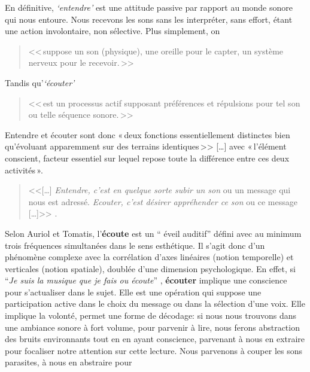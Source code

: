 En définitive, \emph{`entendre'} est une attitude passive par rapport au monde sonore
qui nous entoure. Nous recevons les sons sans les interpréter, sans
effort, étant une action involontaire, non
sélective. Plus simplement, on
\begin{quote}
	<<\,suppose un son (physique), une oreille
	pour le capter, un système nerveux pour le recevoir.\,>>\autocite[2]{auriol:cle}
 \end{quote}
 Tandis qu'\textit{`écouter'}
\begin{quote}
	<<\,est un
	processus actif supposant préférences et répulsions pour tel son ou
	telle séquence sonore.\,>>\autocite[2]{auriol:cle}

\end{quote}
Entendre et écouter sont donc  «\,deux
fonctions essentiellement distinctes bien qu'évoluant apparemment sur
des terrains iden\-ti\-ques\,>>
[\dots] avec «\,l'é\-lé\-ment cons\-cient, facteur essentiel sur lequel repose toute la
différence entre ces deux activités\,». \autocite[122]{tomatis_oreille_1987}
\begin{quote}

	<<[\ldots] \emph{Entendre, c'est en quelque sorte subir
		un son} ou un message qui nous est adressé. \emph{Ecouter, c'est désirer appréhender ce son} ou ce message [\ldots]>>
	\autocite [p. 111]{tomatis:education}.
\end{quote}
Selon Auriol %
 et Tomatis, l'\textbf{écoute} est un `` éveil auditif''  défini avec au
minimum trois
fréquences simultanées dans le sens esthétique. %
Il s'agit donc d'un phénomène
complexe avec la corrélation d'axes
linéaires (notion temporelle) et verticales (notion spatiale), doublée d'une
dimension psychologique.
En effet, si \enquote{\emph{Je suis la musique que je fais ou écoute}}
\autocite [8]{viret:b}, \textbf{écouter} implique une conscience pour s'actualiser dans le sujet.
Elle est une opération
qui suppose une participation active dans le choix du message
ou dans la sélection d'une voix. Elle  implique la volonté,
permet une forme de décodage:
si nous nous trouvons dans une ambiance sonore à fort volume, pour
parvenir à lire, nous
ferons abstraction des bruits environnants tout en en ayant
conscience, parvenant à nous en extraire pour focaliser notre
attention sur cette lecture. Nous parvenons à couper les sons parasites, à nous en abstraire pour
